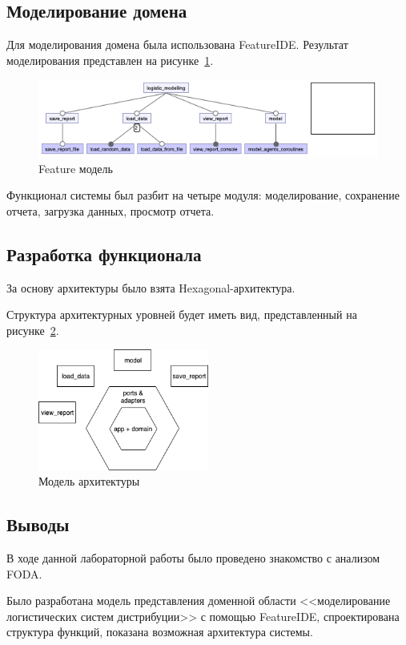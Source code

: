\subsection{Моделирование домена}
Для моделирования домена была использована FeatureIDE. 
Результат моделирования представлен на рисунке~\ref{fig:model}. 

\begin{figure}[H]
    \centering
    \includegraphics[width=\textwidth]{model}
    \caption{Feature модель}
    \label{fig:model}
\end{figure}

Функционал системы был разбит на четыре модуля: моделирование, сохранение отчета, загрузка данных, просмотр отчета.

\subsection{Разработка функционала}
За основу архитектуры было взята Hexagonal-архитектура.

Структура архитектурных уровней будет иметь вид, представленный на рисунке~\ref{fig:arch}.

\begin{figure}[H]
    \centering
    \includegraphics[width=0.5\textwidth]{arch}
    \caption{Модель архитектуры}
    \label{fig:arch}
\end{figure}

\subsection*{Выводы}
В ходе данной лабораторной работы было проведено знакомство с анализом FODA.

Было разработана модель представления доменной области <<моделирование логистических систем дистрибуции>> с помощью FeatureIDE, спроектирована структура функций, показана возможная архитектура системы. 


